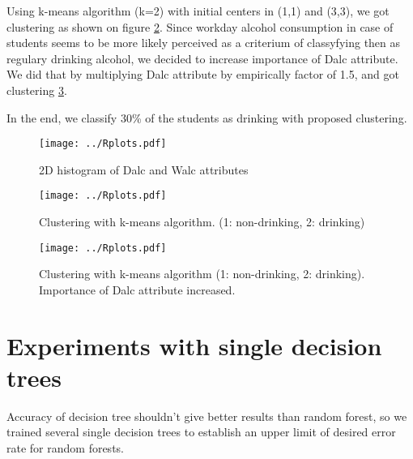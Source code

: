 \documentclass[a4paper]{article}
\begin{document}
\begin{multicols}{2}
Using k-means algorithm (k=2) with initial centers in (1,1) and (3,3), we got clustering as shown on figure \ref{fig:clust}.
Since workday alcohol consumption in case of students seems
to be more likely perceived as a criterium of classyfying then as
regulary drinking alcohol,
we decided to increase importance of Dalc attribute.
We did that by multiplying Dalc attribute by empirically factor of 1.5, and got clustering \ref{fig:clust2}.

In the end, we classify 30\% of the students as drinking with proposed clustering.




\begin{figure}[H]
    \centering
    \texttt{[image: ../Rplots.pdf]}
    \label{fig:hist2D}
    \caption[]{2D histogram of Dalc and Walc attributes}
\end{figure}

\begin{figure}[H]
    \centering
    \texttt{[image: ../Rplots.pdf]}
    \label{fig:clust}
    \caption[]{Clustering with k-means algorithm. (1: non-drinking, 2: drinking)}
\end{figure}

\begin{figure}[H]
    \centering
    \texttt{[image: ../Rplots.pdf]}
    \label{fig:clust2}
    \caption[]{Clustering with k-means algorithm (1: non-drinking, 2: drinking). Importance of Dalc attribute increased.}
\end{figure}


\section{Experiments with single decision trees}
\label{expSingle}

Accuracy of decision tree shouldn't give better results than random forest,
so we trained several single decision trees to establish
an upper limit of desired error rate for random forests.


\end{multicols}
\end{document}

